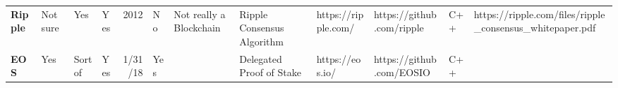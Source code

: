 \begin{table}[ht]
\begin{adjustbox}{width=25cm, height=6cm, angle=270}
\begin{tabular}{llllrlp{17.915em}rlrrr}
      \rowcolor[rgb]{ .267,  .447,  .769} \textcolor[rgb]{ 1,  1,  1}{\textbf{Ripple}} & \cellcolor[rgb]{ 1,  .922,  .612}\textcolor[rgb]{ .612,  .341,  0}{Not sure} & \cellcolor[rgb]{ .776,  .937,  .808}\textcolor[rgb]{ 0,  .38,  0}{Yes} & \cellcolor[rgb]{ .776,  .937,  .808}\textcolor[rgb]{ 0,  .38,  0}{Yes} & \cellcolor[rgb]{ .851,  .882,  .949}\textcolor[rgb]{ .188,  .329,  .588}{2012} & \cellcolor[rgb]{ 1,  .78,  .808}\textcolor[rgb]{ .612,  0,  .024}{No} & \cellcolor[rgb]{ .851,  .882,  .949}\textcolor[rgb]{ .188,  .329,  .588}{Not really a Blockchain} & \multicolumn{1}{l}{\cellcolor[rgb]{ .851,  .882,  .949}\textcolor[rgb]{ .188,  .329,  .588}{Ripple Consensus Algorithm}} & \cellcolor[rgb]{ .851,  .882,  .949}\textcolor[rgb]{ .188,  .329,  .588}{https://ripple.com/} & \multicolumn{1}{l}{\cellcolor[rgb]{ .851,  .882,  .949}\textcolor[rgb]{ .188,  .329,  .588}{https://github.com/ripple}} & \multicolumn{1}{l}{\cellcolor[rgb]{ .851,  .882,  .949}\textcolor[rgb]{ .188,  .329,  .588}{C++}} & \multicolumn{1}{l}{\cellcolor[rgb]{ .851,  .882,  .949}\textcolor[rgb]{ .188,  .329,  .588}{https://ripple.com/files/ripple\_consensus\_whitepaper.pdf}} \\
      \rowcolor[rgb]{ .267,  .447,  .769} \textcolor[rgb]{ 1,  1,  1}{\textbf{EOS}} & \cellcolor[rgb]{ .776,  .937,  .808}\textcolor[rgb]{ 0,  .38,  0}{Yes} & \cellcolor[rgb]{ 1,  .922,  .612}\textcolor[rgb]{ .612,  .341,  0}{Sort of} & \cellcolor[rgb]{ .776,  .937,  .808}\textcolor[rgb]{ 0,  .38,  0}{Yes} & \cellcolor[rgb]{ 1,  1,  1}\textcolor[rgb]{ .188,  .329,  .588}{1/31/18} & \cellcolor[rgb]{ .776,  .937,  .808}\textcolor[rgb]{ 0,  .38,  0}{Yes} & \multicolumn{1}{r}{\cellcolor[rgb]{ 1,  1,  1}\textcolor[rgb]{ .188,  .329,  .588}{}} & \multicolumn{1}{l}{\cellcolor[rgb]{ 1,  1,  1}\textcolor[rgb]{ .188,  .329,  .588}{Delegated Proof of Stake}} & \cellcolor[rgb]{ 1,  1,  1}\textcolor[rgb]{ .188,  .329,  .588}{https://eos.io/} & \multicolumn{1}{l}{\cellcolor[rgb]{ 1,  1,  1}\textcolor[rgb]{ .188,  .329,  .588}{https://github.com/EOSIO}} & \multicolumn{1}{l}{\cellcolor[rgb]{ 1,  1,  1}\textcolor[rgb]{ .188,  .329,  .588}{C++}} & \cellcolor[rgb]{ 1,  1,  1}\textcolor[rgb]{ .188,  .329,  .588}{} \\

\end{tabular}
\end{adjustbox}
\end{table}
